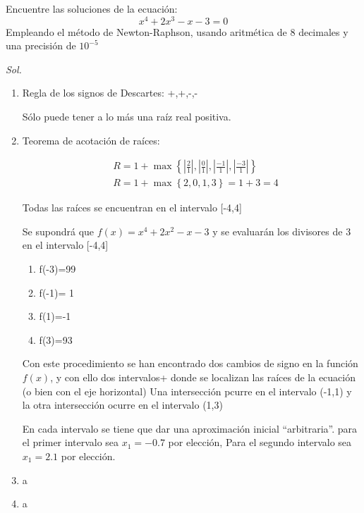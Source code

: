 \begin{example}
	Encuentre las soluciones de la ecuación:
	\begin{equation*}
		x^4+2x^3-x-3=0
	\end{equation*}
	Empleando el método de Newton-Raphson, usando aritmética de 8 decimales y una precisión de $10^{-5}$
\end{example}

\textit{ Sol. }

\begin{enumerate}
	\item Regla de los signos de Descartes: +,+,-,-

	      Sólo puede tener a lo más una raíz real positiva.

	\item Teorema de acotación de raíces:

	      \begin{align*}
		       & R=1+\max \left\{\left\lvert \frac{2}{1}\right\rvert,\left\lvert \frac{0}{1}\right\rvert, \left\lvert \frac{-1}{1}\right\rvert,\left\lvert \frac{-3}{1}\right\rvert \right\} \\
		       & R=1+\max \left\{2,0,1,3\right\}=1+3=4
	      \end{align*}

	      Todas las raíces se encuentran en el intervalo [-4,4]

	      Se supondrá que $f(x)=x^4+2x^2-x-3$ y se evaluarán los divisores de 3 en el intervalo [-4,4]
	      \begin{enumerate}
		      \item f(-3)=99
		      \item f(-1)= 1
		      \item f(1)=-1
		      \item f(3)=93
	      \end{enumerate}
	      Con este procedimiento se han encontrado dos cambios de signo en la función $f(x)$,
	      y con ello dos intervalos+ donde se localizan las raíces de la ecuación (o bien con el eje horizontal)
	      Una intersección pcurre en el intervalo (-1,1) y la otra intersección ocurre en el intervalo (1,3)

	      En cada intervalo se tiene que dar una aproximación inicial ``arbitraria''.
	      para el primer intervalo sea $x_1=-0.7$ por elección,
	      Para el segundo intervalo sea $x_1=2.1$ por elección.

	\item a
	\item a
\end{enumerate}


